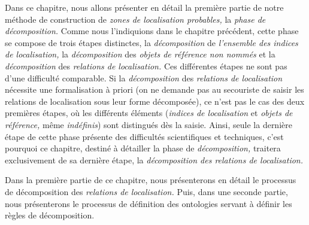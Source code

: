 Dans ce chapitre, nous allons présenter en détail la première partie
de notre méthode de construction de \emph{zones de localisation
  probables,} la \emph{phase de décomposition.} Comme nous
l'indiquions dans le chapitre précédent, cette phase se compose de
trois étapes distinctes, la \emph{décomposition} de \emph{l'ensemble
  des indices de localisation,} la \emph{décomposition} des
\emph{objets de référence non nommés} et la \emph{décomposition} des
\emph{relations de localisation.} Ces différentes étapes ne sont pas
d'une difficulté comparable. Si la \emph{décomposition} des
\emph{relations de localisation} nécessite une formalisation à priori
(on ne demande pas au secouriste de saisir les relations de
localisation sous leur forme décomposée), ce n'est pas le cas des deux
premières étapes, où les différents éléments (\emph{indices de
  localisation} et \emph{objets de référence,} même \emph{indéfinis})
sont distingués dès la saisie. Ainsi, seule la dernière étape de cette
phase présente des difficultés scientifiques et techniques, c'est
pourquoi ce chapitre, destiné à détailler la phase de
\emph{décomposition,} traitera exclusivement de sa dernière étape, la
\emph{décomposition des relations de localisation.}

Dans la première partie de ce chapitre, nous présenterons en détail le
processus de décomposition des \emph{relations de localisation.} Puis,
dans une seconde partie, nous présenterons le processus de définition
des ontologies servant à définir les règles de décomposition.


